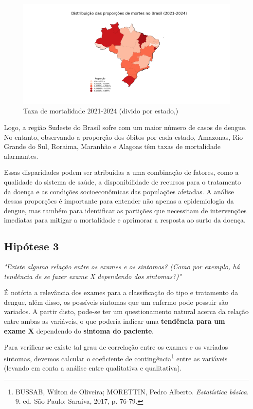 \documentclass[a4paper,12pt]{article}
\begin{document}
\begin{figure}[H]
    \centering
    \includegraphics[width=1.0\textwidth]{images/Heatmap (uf) proportion.png}
    \caption{Taxa de mortalidade 2021-2024 (divido por estado,)}
    \label{fig:heatmap_proportion}
\end{figure}

Logo, a região Sudeste do Brasil sofre com um maior número de casos de dengue. No entanto, observando a proporção dos óbitos por cada estado, Amazonas, Rio Grande do Sul, Roraima, Maranhão e Alagoas têm taxas de mortalidade alarmantes.

Essas disparidades podem ser atribuídas a uma combinação de fatores, como a qualidade do sistema de saúde, a disponibilidade de recursos para o tratamento da doença e as condições socioeconômicas das populações afetadas. A análise dessas proporções é importante para entender não apenas a epidemiologia da dengue, mas também para identificar as partições que necessitam de intervenções imediatas para mitigar a mortalidade e aprimorar a resposta ao surto da doença.

    
\subsection{Hipótese 3}
\emph{"Existe alguma relação entre os exames e os sintomas? (Como por exemplo, há tendência de se fazer exame X dependendo dos sintomas?)"}

É notória a relevância dos exames para a classificação do tipo e tratamento da dengue, além disso, os possíveis sintomas que um enfermo pode possuir são variados. A partir disto, pode-se ter um questionamento natural acerca da relação entre ambas as variáveis, o que poderia indicar uma \textbf{tendência para um exame X} dependendo do \textbf{sintoma do paciente}.

Para verificar se existe tal grau de correlação entre os exames e os variados sintomas, devemos calcular o coeficiente de contingência\footnote{BUSSAB, Wilton de Oliveira; MORETTIN, Pedro Alberto. \textit{Estatística básica}. 9. ed. São Paulo: Saraiva, 2017, p. 76-79.}
 entre as variáveis (levando em conta a análise entre qualitativa e qualitativa). 
\end{document}
